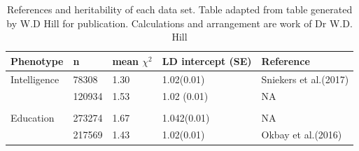 





\begin{table}[]
    \centering
    \begin{tabular}{lllll}
    \toprule
        Phenotype & n & mean $\chi^2$ & LD intercept (SE) & Reference \\
        \midrule
        Intelligence & 78308 & 1.30 & 1.02(0.01) & Sniekers et al.(2017)\cite{sniekers2017genome}\\
        &120934 & 1.53 & 1.02 (0.01)& NA\\
        \\
        Education&273274 & 1.67 & 1.042(0.01) & NA\\
         & 217569&1.43&1.02(0.01) & Okbay et al.(2016)\cite{okbay2016genome}\\
         \bottomrule
    \end{tabular}
    \caption[Summary for each data set]{References and heritability of each data set. Table adapted from table generated by W.D Hill for publication. Calculations and arrangement are work of Dr W.D. Hill}
    \label{tab:supplementary dh table 1 datasets}
\end{table}



